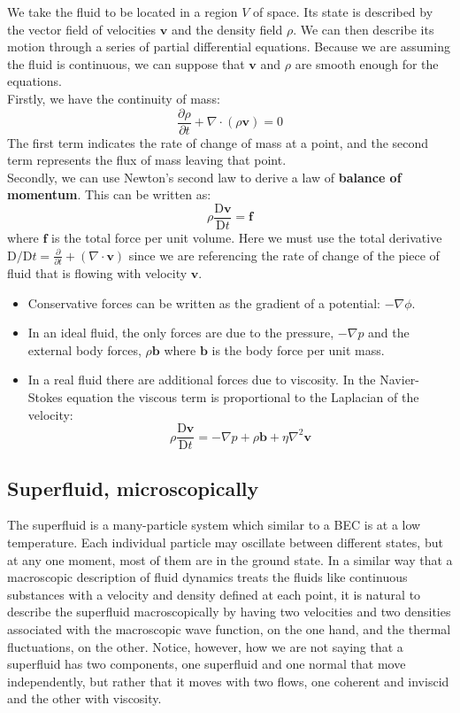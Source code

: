 \documentclass{article}
\begin{document}
We take the fluid to be located in a region $V$ of space.  Its state is
described by the vector field of velocities $\mathbf{v}$ and the density
field $\rho$.  We can then describe its motion through a series of partial
differential equations.  Because we are assuming the fluid is continuous, we
can suppose that $\mathbf{v}$ and $\rho$ are smooth enough for the equations.
\\

Firstly, we have the continuity of mass:
\[\frac{\partial\rho}{\partial t} + \nabla\cdot(\rho\mathbf{v}) = 0\]
The first term indicates the rate of change of mass at a point, and the second
term represents the flux of mass leaving that point.
\\

Secondly, we can use Newton's second law to derive a law of
\textbf{balance of momentum}.	This can be written as:
\[\rho\frac{\mathrm{D}\mathbf{v}}{\mathrm{D} t}= \mathbf{f}\]
where $\mathbf{f}$ is the total force per unit volume.	Here we must use the
total derivative
$\mathrm{D}/\mathrm{D}t = \frac{\partial}{\partial t} + (\nabla \cdot
    \mathbf{v})$
since we are referencing the rate of change of the piece of fluid that is
flowing with velocity $\mathbf{v}$.
\begin{itemize}
    \item Conservative forces can be written as the gradient of a potential: $-\nabla\phi$.
    \item In an ideal fluid, the only forces are due to the pressure, $-\nabla p$ and the external body forces, $\rho \mathbf{b}$ where $\mathbf{b}$ is the body force per unit mass.
    \item In a real fluid there are additional forces due to viscosity. In the Navier-Stokes equation the viscous term is proportional to the Laplacian of the velocity:
\[\rho\frac{\mathrm{D}\mathbf{v}}{\mathrm{D} t}=-\nabla p + \rho \mathbf{b} +
    \eta\nabla^2{\mathbf{v}}\]
\end{itemize}

\subsection{Superfluid, microscopically}

The superfluid is a many-particle system which similar to a BEC is at a low temperature.  Each individual particle may oscillate between different states, but at any one moment, most of them are in the ground state.  In a similar way that a macroscopic description of fluid dynamics treats the fluids like continuous substances with a velocity and density defined at each point, it is natural to describe the superfluid macroscopically by having two velocities and two densities associated with the macroscopic wave function, on the one hand, and the thermal fluctuations, on the other.  Notice, however, how we are not saying that a superfluid has two components, one superfluid and one normal that move independently, but rather that it moves with two flows, one coherent and inviscid and the other with viscosity.
\end{document}
